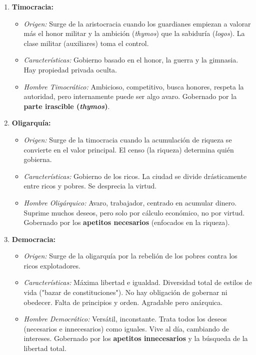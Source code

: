 \documentclass[11pt, a4paper]{article}
\begin{document}
\begin{enumerate}
    \item \textbf{Timocracia:}
        \begin{itemize}
            \item \textit{Origen:} Surge de la aristocracia cuando los guardianes empiezan a valorar más el honor militar y la ambición (\textit{thymos}) que la sabiduría (\textit{logos}). La clase militar (auxiliares) toma el control.
            \item \textit{Características:} Gobierno basado en el honor, la guerra y la gimnasia. Hay propiedad privada oculta.
            \item \textit{Hombre Timocrático:} Ambicioso, competitivo, busca honores, respeta la autoridad, pero internamente puede ser algo avaro. Gobernado por la \textbf{parte irascible (\textit{thymos})}.
        \end{itemize}

    \item \textbf{Oligarquía:}
        \begin{itemize}
            \item \textit{Origen:} Surge de la timocracia cuando la acumulación de riqueza se convierte en el valor principal. El censo (la riqueza) determina quién gobierna.
            \item \textit{Características:} Gobierno de los ricos. La ciudad se divide drásticamente entre ricos y pobres. Se desprecia la virtud.
            \item \textit{Hombre Oligárquico:} Avaro, trabajador, centrado en acumular dinero. Suprime muchos deseos, pero solo por cálculo económico, no por virtud. Gobernado por los \textbf{apetitos necesarios} (enfocados en la riqueza).
        \end{itemize}

    \item \textbf{Democracia:}
        \begin{itemize}
            \item \textit{Origen:} Surge de la oligarquía por la rebelión de los pobres contra los ricos explotadores.
            \item \textit{Características:} Máxima libertad e igualdad. Diversidad total de estilos de vida ("bazar de constituciones"). No hay obligación de gobernar ni obedecer. Falta de principios y orden. Agradable pero anárquica.
            \item \textit{Hombre Democrático:} Versátil, inconstante. Trata todos los deseos (necesarios e innecesarios) como iguales. Vive al día, cambiando de intereses. Gobernado por los \textbf{apetitos innecesarios} y la búsqueda de la libertad total.
        \end{itemize}


\end{enumerate}
\end{document}
